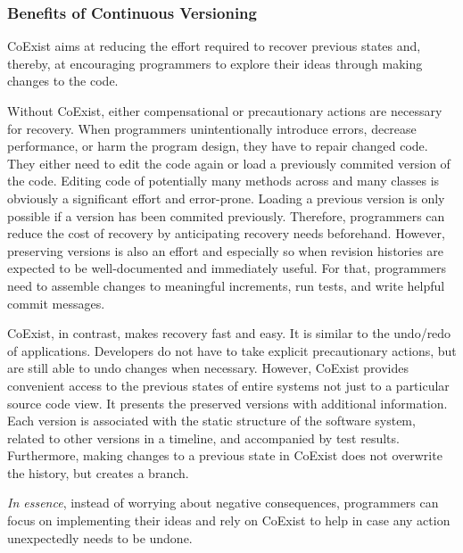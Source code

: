 \subsubsection{Benefits of Continuous Versioning}

CoExist aims at reducing the effort required to recover previous states and, thereby, at encouraging programmers to explore their ideas through making changes to the code.

Without CoExist, either compensational or precautionary actions are necessary for recovery.
When programmers unintentionally introduce errors, decrease performance, or harm the program design, they have to repair changed code.
They either need to edit the code again or load a previously commited version of the code.
Editing code of potentially many methods across and many classes is obviously a significant effort and error-prone.
Loading a previous version is only possible if a version has been commited previously.
Therefore, programmers can reduce the cost of recovery by anticipating recovery needs beforehand.
However, preserving versions is also an effort and especially so when revision histories are expected to be well-documented and immediately useful.
For that, programmers need to assemble changes to meaningful increments, run tests, and write helpful commit messages.

CoExist, in contrast, makes recovery fast and easy.
It is similar to the undo/redo of applications.
Developers do not have to take explicit precautionary actions, but are still able to undo changes when necessary.
However, CoExist provides convenient access to the previous states of entire systems not just to a particular source code view.
It presents the preserved versions with additional information.
Each version is associated with the static structure of the software system, related to other versions in a timeline, and accompanied by test results.
Furthermore, making changes to a previous state in CoExist does not overwrite the history, but creates a branch.

\emph{In essence}, instead of worrying about negative consequences, programmers can focus on implementing their ideas and rely on CoExist to help in case any action unexpectedly needs to be undone.
